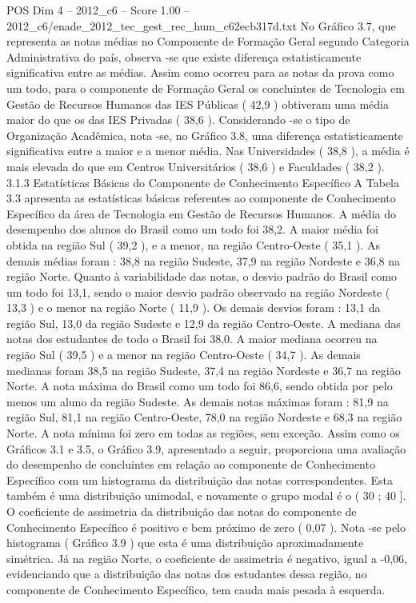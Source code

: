 \begin{textsample}{POS Dim 4 – 2012\_c6 – Score 1.00 – 2012\_c6/enade\_2012\_tec\_gest\_rec\_hum\_c62ecb317d.txt}
No Gráfico 3.7, que representa as notas médias no Componente de Formação Geral segundo Categoria Administrativa do país, observa -se que existe diferença estatisticamente significativa entre as médias.
Assim como ocorreu para as notas da prova como um todo, para o componente de Formação Geral os concluintes de Tecnologia em Gestão de Recursos Humanos das IES Públicas ( 42,9 ) obtiveram uma média maior do que os das IES Privadas ( 38,6 ).
Considerando -se o tipo de Organização Acadêmica, nota -se, no Gráfico 3.8, uma diferença estatisticamente significativa entre a maior e a menor média.
Nas Universidades ( 38,8 ), a média é mais elevada do que em Centros Universitários ( 38,6 ) e Faculdades ( 38,2 ). 3.1.3 Estatísticas Básicas do Componente de Conhecimento Específico A Tabela 3.3 apresenta as estatísticas básicas referentes ao componente de Conhecimento Específico da área de Tecnologia em Gestão de Recursos Humanos.
A média do desempenho dos alunos do Brasil como um todo foi 38,2.
A maior média foi obtida na região Sul ( 39,2 ), e a menor, na região Centro-Oeste ( 35,1 ).
As demais médias foram : 38,8 na região Sudeste, 37,9 na região Nordeste e 36,8 na região Norte.
Quanto à variabilidade das notas, o desvio padrão do Brasil como um todo foi 13,1, sendo o maior desvio padrão observado na região Nordeste ( 13,3 ) e o menor na região Norte ( 11,9 ).
Os demais desvios foram : 13,1 da região Sul, 13,0 da região Sudeste e 12,9 da região Centro-Oeste.
A mediana das notas dos estudantes de todo o Brasil foi 38,0.
A maior mediana ocorreu na região Sul ( 39,5 ) e a menor na região Centro-Oeste ( 34,7 ).
As demais medianas foram 38,5 na região Sudeste, 37,4 na região Nordeste e 36,7 na região Norte.
A nota máxima do Brasil como um todo foi 86,6, sendo obtida por pelo menos um aluno da região Sudeste.
As demais notas máximas foram : 81,9 na região Sul, 81,1 na região Centro-Oeste, 78,0 na região Nordeste e 68,3 na região Norte.
A nota mínima foi zero em todas as regiões, sem exceção.
Assim como os Gráficos 3.1 e 3.5, o Gráfico 3.9, apresentado a seguir, proporciona uma avaliação do desempenho de concluintes em relação ao componente de Conhecimento Específico com um histograma da distribuição das notas correspondentes.
Esta também é uma distribuição unimodal, e novamente o grupo modal é o ( 30 ; 40 ].
O coeficiente de assimetria da distribuição das notas do componente de Conhecimento Específico é positivo e bem próximo de zero ( 0,07 ).
Nota -se pelo histograma ( Gráfico 3.9 ) que esta é uma distribuição aproximadamente simétrica.
Já na região Norte, o coeficiente de assimetria é negativo, igual a -0,06, evidenciando que a distribuição das notas dos estudantes dessa região, no componente de Conhecimento Específico, tem cauda mais pesada à esquerda.

\end{textsample}
